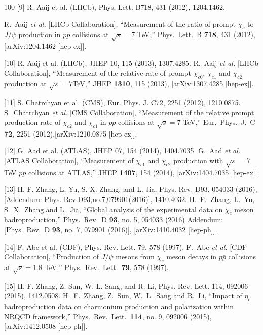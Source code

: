 \documentclass[aps,prc,preprint,superscriptaddress,showpacs,showkeys,amsmath]{revtex4-1}
\begin{document}
\begin{thebibliography}{100}
[9] R. Aaij et al. (LHCb), Phys. Lett. B718, 431 (2012), 1204.1462.

  R.~Aaij {\it et al.} [LHCb Collaboration],
  ``Measurement of the ratio of prompt $\chi_{c}$ to $J/\psi$ production in $pp$ collisions at $\sqrt{s}=7$ TeV,''
  Phys.\ Lett.\ B {\bf 718}, 431 (2012),[arXiv:1204.1462 [hep-ex]].


  [10] R. Aaij et al. (LHCb), JHEP 10, 115 (2013), 1307.4285.
  R.~Aaij {\it et al.} [LHCb Collaboration],
  ``Measurement of the relative rate of prompt $\chi_{c0}$, $\chi_{c1}$ and $\chi_{c2}$ production at $\sqrt{s}=7$TeV,''
  JHEP {\bf 1310}, 115 (2013), [arXiv:1307.4285 [hep-ex]].
 
[11] S. Chatrchyan et al. (CMS), Eur. Phys. J. C72, 2251 (2012), 1210.0875.
  S.~Chatrchyan {\it et al.} [CMS Collaboration],
  ``Measurement of the relative prompt production rate of $\chi_{c2}$ and $\chi_{c1}$ 
  in $pp$ collisions at $\sqrt{s}=7$ TeV,''
  Eur.\ Phys.\ J.\ C {\bf 72}, 2251 (2012),[arXiv:1210.0875 [hep-ex]].

[12] G. Aad et al. (ATLAS), JHEP 07, 154 (2014), 1404.7035.
  G.~Aad {\it et al.} [ATLAS Collaboration],
  ``Measurement of $\chi_{c1}$ and $\chi_{c2}$ production with $\sqrt{s}$ = 7 TeV $pp$ collisions at ATLAS,''
  JHEP {\bf 1407}, 154 (2014), [arXiv:1404.7035 [hep-ex]].

[13] H.-F. Zhang, L. Yu, S.-X. Zhang, and L. Jia, Phys. Rev. D93, 054033 (2016), 
 [Addendum: Phys. Rev.D93,no.7,079901(2016)], 1410.4032.
  H.~F.~Zhang, L.~Yu, S.~X.~Zhang and L.~Jia,
  ``Global analysis of the experimental data on $\chi_c$ meson hadroproduction,''
  Phys.\ Rev.\ D {\bf 93}, no. 5, 054033 (2016) Addendum: [Phys.\ Rev.\ D {\bf 93}, no. 7, 079901 (2016)], 
  [arXiv:1410.4032 [hep-ph]].

  [14] F. Abe et al. (CDF), Phys. Rev. Lett. 79, 578 (1997).
  F.~Abe {\it et al.} [CDF Collaboration],
  ``Production of $J/\psi$ mesons from $\chi_c$ meson decays in $p\bar{p}$ collisions at $\sqrt{s} = 1.8$ TeV,''
  Phys.\ Rev.\ Lett.\  {\bf 79}, 578 (1997).


[15] H.-F. Zhang, Z. Sun, W.-L. Sang, and R. Li, Phys. Rev. Lett. 114, 092006 (2015), 1412.0508.
  H.~F.~Zhang, Z.~Sun, W.~L.~Sang and R.~Li,
  ``Impact of $\eta_c$ hadroproduction data on charmonium production and polarization within NRQCD framework,''
  Phys.\ Rev.\ Lett.\  {\bf 114}, no. 9, 092006 (2015), [arXiv:1412.0508 [hep-ph]].
  
\end{thebibliography}
\end{document}
